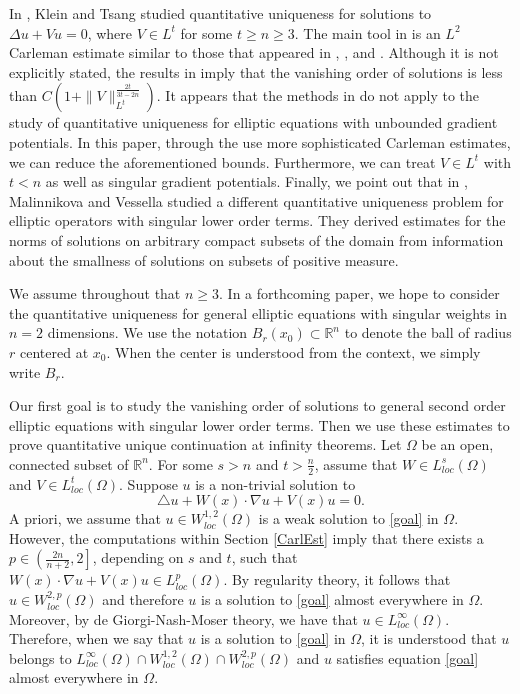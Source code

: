 \documentclass[11pt]{amsart}
\theoremstyle{plain}
\numberwithin{equation}{section}
\begin{document}
 In \cite{KT16}, Klein and Tsang studied quantitative uniqueness for solutions to ${\Delta} u + V u = 0$, where $V \in L^t$ for some $t \ge n \ge 3$.
 The main tool in \cite{KT16} is an $L^2$ Carleman estimate similar to those that appeared in \cite{BK05}, \cite{Ken07}, and \cite{Dav14}.
Although it is not explicitly stated, the  results in \cite{KT16}
imply that the vanishing order of solutions is less than
$C(1+\|V\|_{L^t}^{\frac{ 2t}{3t-2n} })$. It appears that the methods
in \cite{KT16} do not apply to the study of quantitative uniqueness
for elliptic equations with unbounded gradient potentials. In this
paper, through the use more sophisticated Carleman estimates, we can
reduce the aforementioned bounds. Furthermore, we can treat $V \in
L^t$ with $t < n$ as well as singular gradient potentials. Finally,
we point out that in \cite{MV12}, Malinnikova and Vessella studied a
different quantitative uniqueness problem for elliptic operators
with singular lower order terms.
They derived estimates for the norms of solutions on arbitrary compact subsets of the domain from information about the smallness of solutions on subsets of positive measure.

We assume throughout that $n \ge 3$. In a forthcoming paper, we hope
to consider the quantitative uniqueness for general elliptic
equations with singular weights in $n=2$ dimensions. We use the
notation $B_{r}{\left( {x_0} \right) } {\subset} {\ensuremath{\mathbb{R}}}^n$ to denote the ball of radius $r$
centered at $x_0$. When the center is understood from the context,
we simply write $B_{r}$.

Our first goal is to study the vanishing order of solutions to general second order elliptic equations with singular lower order terms.
Then we use these estimates to prove quantitative unique continuation at infinity theorems.
Let ${\Omega}$ be an open, connected subset of ${\ensuremath{\mathbb{R}}}^n$.
For some $s > n$ and $t > \frac n 2$, assume that $W \in L^s_{loc}{\left( {\Omega} \right) }$ and $V \in L^t_{loc}{\left( {\Omega} \right) }$.
Suppose $u$ is a non-trivial solution to
\begin{equation}
\triangle u+ W(x)\cdot \nabla u+V(x) u=0.
\label{goal}
\end{equation}
A priori, we assume that $u \in W^{1,2}_{loc}{\left( {\Omega} \right) }$ is a weak solution to \eqref{goal} in ${\Omega}$.
However, the computations within Section \ref{CarlEst} imply that there exists a $p \in {\left( {\frac{2n}{n+2}, 2} \right] }$, depending on $s$ and $t$, such that $W(x)\cdot \nabla u+V(x) u \in L^p_{loc}{\left( {\Omega} \right) }$.
By regularity theory, it follows that $u \in W_{loc}^{2,p}{\left( {\Omega} \right) }$ and therefore $u$ is a solution to \eqref{goal} almost everywhere in ${\Omega}$.
Moreover, by de Giorgi-Nash-Moser theory, we have that $u \in L^{\infty}_{loc}{\left( {\Omega} \right) }$.
Therefore, when we say that $u$ is a solution to \eqref{goal} in ${\Omega}$, it is understood that $u$ belongs to $L^{\infty}_{loc}{\left( {\Omega} \right) } \cap W^{1,2}_{loc}{\left( {\Omega} \right) } \cap W^{2,p}_{loc}{\left( {\Omega} \right) }$ and $u$ satisfies equation \eqref{goal} almost everywhere in ${\Omega}$.
\end{document}
